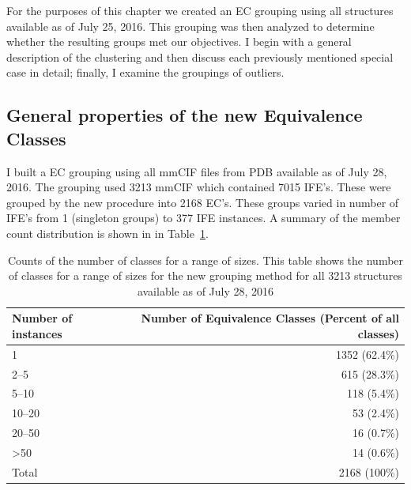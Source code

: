 For the purposes of this chapter we created an EC grouping using all structures
available as of July 25, 2016. This grouping was then analyzed to determine
whether the resulting groups met our objectives. I begin with a general
description of the clustering and then discuss each previously mentioned special
case in detail; finally, I examine the groupings of outliers.

\subsection{General properties of the new Equivalence Classes}

I built a EC grouping using all mmCIF files from PDB available as of July 28,
2016. The grouping used 3213 mmCIF which contained 7015 IFE's. These were
grouped by the new procedure into 2168 EC's. These groups varied in number
of IFE's from 1 (singleton groups) to 377 IFE instances. A summary of the
member count distribution is shown in in Table~\ref{tab:eq-size-dist}.

\begin{table}
  \begin{tabular}{lr}
    \toprule
    Number of instances & Number of Equivalence Classes (Percent of all classes) \\
    \midrule
    1               & 1352 (62.4\%) \\
    2--5             & 615 (28.3\%)  \\
    5--10            & 118 (5.4\%)   \\
    10--20           & 53 (2.4\%)    \\
    20--50           & 16 (0.7\%)    \\
    \textgreater 50 & 14 (0.6\%)    \\
    Total           & 2168 (100\%)  \\
    \bottomrule
  \end{tabular}
  \caption{Counts of the number of classes for a range of sizes. This table
    shows the number of classes for a range of sizes for the new grouping method
  for all 3213 structures available as of July 28, 2016}
  \label{tab:eq-size-dist}
\end{table}

